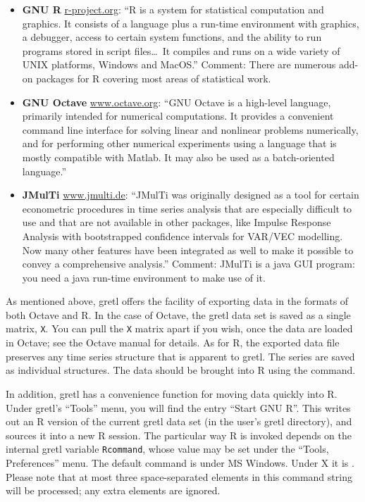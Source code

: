 \begin{itemize}

\item \textbf{GNU R} \href{http://www.r-project.org/}{r-project.org}:
  ``R is a system for statistical computation and graphics. It
  consists of a language plus a run-time environment with graphics, a
  debugger, access to certain system functions, and the ability to run
  programs stored in script files\dots\ It compiles and runs on a wide
  variety of UNIX platforms, Windows and MacOS.''  Comment: There are
  numerous add-on packages for R covering most areas of statistical
  work.

\item \textbf{GNU Octave}
  \href{http://www.octave.org/}{www.octave.org}:
  ``GNU Octave is a high-level language, primarily intended for
  numerical computations. It provides a convenient command line
  interface for solving linear and nonlinear problems numerically, and
  for performing other numerical experiments using a language that is
  mostly compatible with Matlab. It may also be used as a
  batch-oriented language.''

\item \textbf{JMulTi} \href{http://www.jmulti.de/}{www.jmulti.de}:
  ``JMulTi was originally designed as a tool for certain econometric
  procedures in time series analysis that are especially difficult to
  use and that are not available in other packages, like Impulse
  Response Analysis with bootstrapped confidence intervals for VAR/VEC
  modelling. Now many other features have been integrated as well to
  make it possible to convey a comprehensive analysis.''  Comment:
  JMulTi is a java GUI program: you need a java run-time environment to
  make use of it.

\end{itemize}

As mentioned above, gretl offers the facility of exporting
data in the formats of both Octave and R.  In the case of Octave, the
gretl data set is saved as a single matrix, \verb+X+. You can
pull the \verb+X+ matrix apart if you wish, once the data are loaded
in Octave; see the Octave manual for details.  As for R, the exported
data file preserves any time series structure that is apparent to
gretl.  The series are saved as individual structures. The data
should be brought into R using the  command.
  
In addition, gretl has a convenience function for moving data
quickly into R.  Under gretl's ``Tools'' menu, you will find the
entry ``Start GNU R''.  This writes out an R version of the current
gretl data set (in the user's gretl directory), and sources it
into a new R session.  The particular way R is invoked depends on the
internal gretl variable \verb+Rcommand+, whose value may be set
under the ``Tools, Preferences'' menu.  The default command is
 under MS Windows. Under X it is .
Please note that at most three space-separated elements in this
command string will be processed; any extra elements are ignored.

